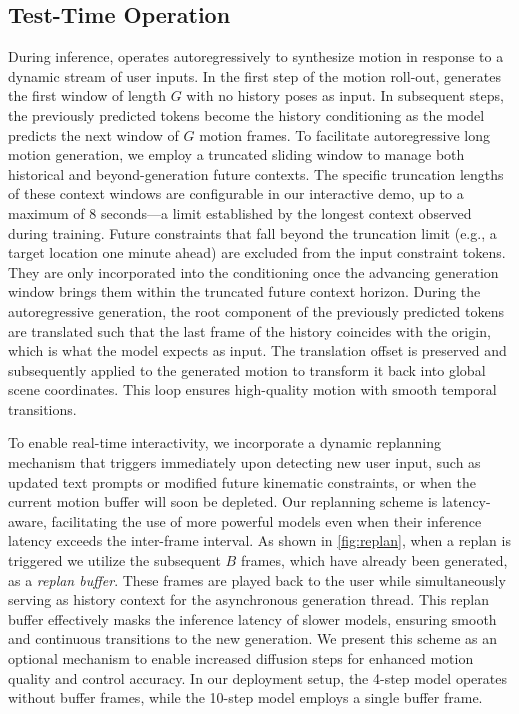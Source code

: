\subsection{Test-Time Operation}
During inference, \method operates autoregressively to synthesize motion in response to a dynamic stream of user inputs. 
In the first step of the motion roll-out, \method generates the first window of length $G$ with no history poses as input. In subsequent steps, the previously predicted tokens become the history conditioning as the model predicts the next window of $G$ motion frames. 
To facilitate autoregressive long motion generation, we employ a truncated sliding window to manage both historical and beyond-generation future contexts. The specific truncation lengths of these context windows are configurable in our interactive demo, up to a maximum of 8 seconds—a limit established by the longest context observed during training. Future constraints that fall beyond the truncation limit (e.g., a target location one minute ahead) are excluded from the input constraint tokens. They are only incorporated into the conditioning once the advancing generation window brings them within the truncated future context horizon.
During the autoregressive generation, the root component of the previously predicted tokens are translated such that the last frame of the history coincides with the origin, which is what the model expects as input. The translation offset is preserved and subsequently applied to the generated motion to transform it back into global scene coordinates. This loop ensures high-quality motion with smooth temporal transitions.

To enable real-time interactivity, we incorporate a dynamic replanning mechanism that triggers immediately upon detecting new user input, such as updated text prompts or modified future kinematic constraints, or when the current motion buffer will soon be depleted. 
Our replanning scheme is latency-aware, facilitating the use of more powerful models even when their inference latency exceeds the inter-frame interval. 
As shown in \cref{fig:replan}, when a replan is triggered we utilize the subsequent $B$ frames, which have already been generated, as a \textit{replan buffer}. These frames are played back to the user while simultaneously serving as history context for the asynchronous generation thread. This replan buffer effectively masks the inference latency of slower models, ensuring smooth and continuous transitions to the new generation. We present this scheme as an optional mechanism to enable increased diffusion steps for enhanced motion quality and control accuracy. In our deployment setup, the 4-step model operates without buffer frames, while the 10-step model employs a single buffer frame.


